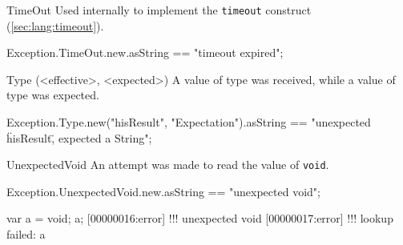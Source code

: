 \begin{urbiscriptapi}
\item[TimeOut]%
  Used internally to implement the \lstinline|timeout| construct
  (\autoref{sec:lang:timeout}).
\begin{urbiassert}
Exception.TimeOut.new.asString
  == "timeout expired";
\end{urbiassert}


\item[Type](<effective>, <expected>)%
  A value of type  was received, while a value of type
   was expected.
\begin{urbiassert}
Exception.Type.new("hisResult", "Expectation").asString
  == "unexpected \"hisResult\", expected a String";
\end{urbiassert}


\item[UnexpectedVoid]%
  An attempt was made to read the value of \lstinline|void|.
\begin{urbiassert}
Exception.UnexpectedVoid.new.asString
  == "unexpected void";
\end{urbiassert}
\begin{urbiscript}
var a = void;
a;
[00000016:error] !!! unexpected void
[00000017:error] !!! lookup failed: a
\end{urbiscript}
\end{urbiscriptapi}


